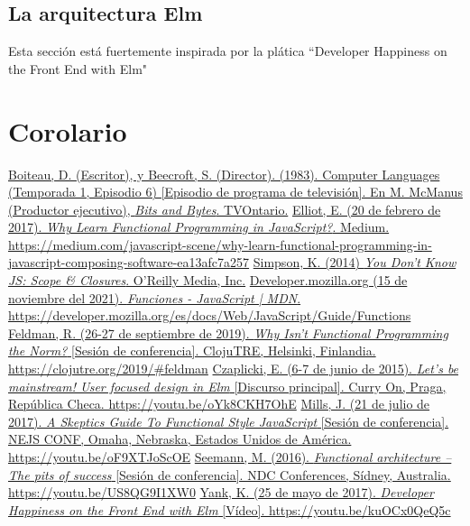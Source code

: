 \documentclass{article}
\begin{document}
\subsection{La arquitectura Elm}
Esta sección está fuertemente inspirada por la plática ``Developer Happiness on the Front End with Elm"\cite{developer-happiness-elm}


\section{Corolario}


\pagebreak
\begin{thebibliography}{99}
   \href{https://youtu.be/_C5AHaS1mOA}{Boiteau, D. (Escritor), y Beecroft, S. (Director). (1983). Computer Languages (Temporada 1, Episodio 6) [Episodio de programa de televisión]. En M. McManus (Productor ejecutivo), \textit{Bits and Bytes}. TVOntario.}
   \href{https://medium.com/javascript-scene/why-learn-functional-programming-in-javascript-composing-software-ea13afc7a257}{Elliot, E. (20 de febrero de 2017). \textit{Why Learn Functional Programming in JavaScript?}. Medium. https://medium.com/javascript-scene/why-learn-functional-programming-in-javascript-composing-software-ea13afc7a257}
   \href{https://github.com/getify/You-Dont-Know-JS/blob/1st-ed/scope\%20\&\%20closures/README.md\#you-dont-know-js-scope--closures}{Simpson, K. (2014) \textit{You Don't Know JS: Scope \& Closures}. O'Reilly Media, Inc.}
   \href{https://developer.mozilla.org/es/docs/Web/JavaScript/Guide/Functions}{Developer.mozilla.org (15 de noviembre del 2021). \textit{Funciones - JavaScript | MDN}. https://developer.mozilla.org/es/docs/Web/JavaScript/Guide/Functions}
   \href{https://clojutre.org/2019/#feldman}{Feldman, R. (26-27 de septiembre de 2019). \textit{Why Isn't Functional Programming the Norm?} [Sesión de conferencia]. ClojuTRE, Helsinki, Finlandia. https://clojutre.org/2019/\#feldman}
   \href{https://youtu.be/oYk8CKH7OhE}{Czaplicki, E. (6-7 de junio de 2015). \textit{Let's be mainstream! User focused design in Elm} [Discurso principal]. Curry On, Praga, República Checa. https://youtu.be/oYk8CKH7OhE}
   \href{https://youtu.be/oF9XTJoScOE}{Mills, J. (21 de julio de 2017). \textit{A Skeptics Guide To Functional Style JavaScript} [Sesión de conferencia]. NEJS CONF, Omaha, Nebraska, Estados Unidos de América. https://youtu.be/oF9XTJoScOE}
   \href{https://youtu.be/US8QG9I1XW0}{Seemann, M. (2016). \textit{Functional architecture – The pits of success} [Sesión de conferencia]. NDC Conferences, Sídney, Australia. https://youtu.be/US8QG9I1XW0}
   \href{https://youtu.be/kuOCx0QeQ5c}{Yank, K. (25 de mayo de 2017). \textit{Developer Happiness on the Front End with Elm} [Vídeo]. https://youtu.be/kuOCx0QeQ5c}
\end{thebibliography}
\end{document}

